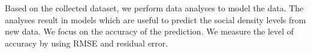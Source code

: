 Based on the collected dataset, we perform data analyses to model the data. The analyses result in models which are useful to predict the social density levels from new data. We focus on the accuracy of the prediction. We measure the level of accuracy by using \ac{RMSE} and residual error.






